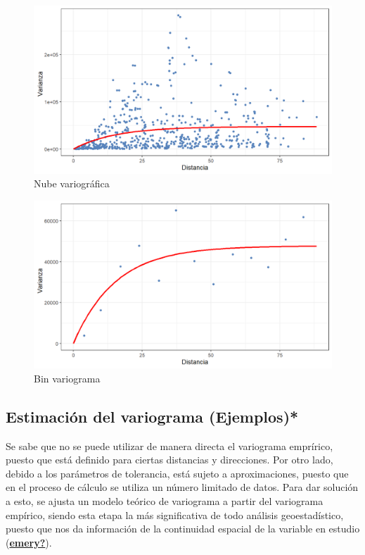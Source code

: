 \documentclass[
]{book}
\begin{document}
\begin{figure}
\includegraphics[width=17.78in]{figuras/otros/cloud_variogram} \caption{Nube variográfica}\label{fig:varcloud1}
\end{figure}
\begin{figure}
\includegraphics[width=17.78in]{figuras/otros/bin_variogram} \caption{Bin variograma}\label{fig:varcloud2}
\end{figure}

\hypertarget{estimaciuxf3n-del-variograma-ejemplos}{%
\subsection{Estimación del variograma (Ejemplos)*}\label{estimaciuxf3n-del-variograma-ejemplos}}

Se sabe que no se puede utilizar de manera directa el variograma emprírico, puesto que está definido para ciertas distancias y direcciones. Por otro lado, debido a los parámetros de tolerancia, está sujeto a aproximaciones, puesto que en el proceso de cálculo se utiliza un número limitado de datos. Para dar solución a esto, se ajusta un modelo teórico de variograma a partir del variograma empírico, siendo esta etapa la más significativa de todo análisis geoestadístico, puesto que nos da información de la continuidad espacial de la variable en estudio (\protect\hyperlink{ref-emery}{\textbf{emery?}}).
\end{document}

